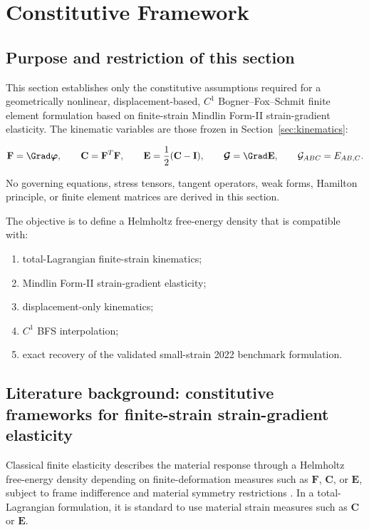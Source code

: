\documentclass[11pt]{article}
\begin{document}
\section{Constitutive Framework}
\label{sec:constitutive}

\subsection{Purpose and restriction of this section}

This section establishes only the constitutive assumptions required for a geometrically nonlinear, displacement-based, $C^1$ Bogner--Fox--Schmit finite element formulation based on finite-strain Mindlin Form-II strain-gradient elasticity. The kinematic variables are those frozen in Section~\ref{sec:kinematics}:

\begin{equation}
\mathbf{F}=\Grad\bm{\varphi},
\qquad
\mathbf{C}=\mathbf{F}^{T}\mathbf{F},
\qquad
\mathbf{E}=\frac{1}{2}(\mathbf{C}-\mathbf{I}),
\qquad
\bm{\mathcal{G}}=\Grad\mathbf{E},
\qquad
\mathcal{G}_{ABC}=E_{AB,C}.
\label{eq:sec2_kinematic_input}
\end{equation}

No governing equations, stress tensors, tangent operators, weak forms, Hamilton principle, or finite element matrices are derived in this section.

The objective is to define a Helmholtz free-energy density that is compatible with:

\begin{enumerate}
\item total-Lagrangian finite-strain kinematics;
\item Mindlin Form-II strain-gradient elasticity;
\item displacement-only kinematics;
\item $C^1$ BFS interpolation;
\item exact recovery of the validated small-strain 2022 benchmark formulation.
\end{enumerate}

\subsection{Literature background: constitutive frameworks for finite-strain strain-gradient elasticity}

Classical finite elasticity describes the material response through a Helmholtz free-energy density depending on finite-deformation measures such as $\mathbf{F}$, $\mathbf{C}$, or $\mathbf{E}$, subject to frame indifference and material symmetry restrictions \cite{Rivlin1948,Ogden1997,Holzapfel2000,BonetWood2008,GurtinFriedAnand2010}. In a total-Lagrangian formulation, it is standard to use material strain measures such as $\mathbf{C}$ or $\mathbf{E}$.
\end{document}
